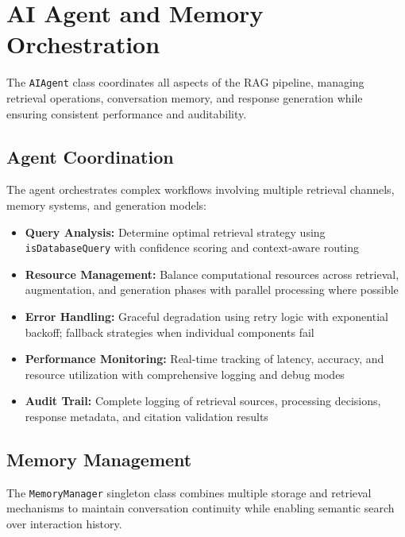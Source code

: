 \section{AI Agent and Memory Orchestration}
\label{sec:agent_memory_s2}

The \texttt{AIAgent} class coordinates all aspects of the RAG pipeline, managing retrieval operations, conversation memory, and response generation while ensuring consistent performance and auditability.

\subsection{Agent Coordination}
\label{subsec:agent_coordination_s2}

The agent orchestrates complex workflows involving multiple retrieval channels, memory systems, and generation models:

\begin{itemize}
    \item \textbf{Query Analysis:} Determine optimal retrieval strategy using \texttt{isDatabaseQuery} with confidence scoring and context-aware routing
    \item \textbf{Resource Management:} Balance computational resources across retrieval, augmentation, and generation phases with parallel processing where possible
    \item \textbf{Error Handling:} Graceful degradation using retry logic with exponential backoff; fallback strategies when individual components fail
    \item \textbf{Performance Monitoring:} Real-time tracking of latency, accuracy, and resource utilization with comprehensive logging and debug modes
    \item \textbf{Audit Trail:} Complete logging of retrieval sources, processing decisions, response metadata, and citation validation results
\end{itemize}

\subsection{Memory Management}
\label{subsec:memory_management_s2}

The \texttt{MemoryManager} singleton class combines multiple storage and retrieval mechanisms to maintain conversation continuity while enabling semantic search over interaction history.

